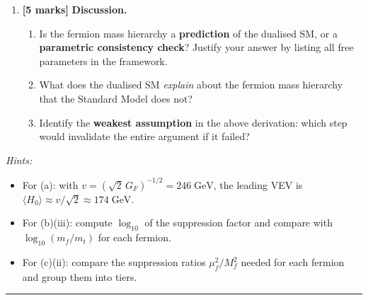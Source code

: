 \documentclass[11pt,a4paper]{article}
\begin{document}
\begin{enumerate}[label=(\alph*)]
  \item \textbf{[5 marks]}
    \textbf{Discussion.}
    \begin{enumerate}[label=(\roman*)]
      \item Is the fermion mass hierarchy a \textbf{prediction} of the
        dualised SM, or a \textbf{parametric consistency check}?  Justify
        your answer by listing all free parameters in the framework.

      \item What does the dualised SM \emph{explain} about the fermion
        mass hierarchy that the Standard Model does not?

      \item Identify the \textbf{weakest assumption} in the above
        derivation: which step would invalidate the entire argument if it
        failed?
    \end{enumerate}

\end{enumerate}

\medskip

\noindent\textit{Hints:}
\begin{itemize}
  \item For (a): with $v = (\sqrt{2}\,G_F)^{-1/2} = 246\;\text{GeV}$,
    the leading VEV is $\langle H_0\rangle \approx v/\sqrt{2}
    \approx 174\;\text{GeV}$.
  \item For (b)(iii): compute $\log_{10}$ of the suppression factor
    and compare with $\log_{10}(m_f/m_t)$ for each fermion.
  \item For (c)(ii): compare the suppression ratios $\mu_f^2/M_f^2$
    needed for each fermion and group them into tiers.
\end{itemize}

\bigskip
\hrule
\bigskip
\end{document}
